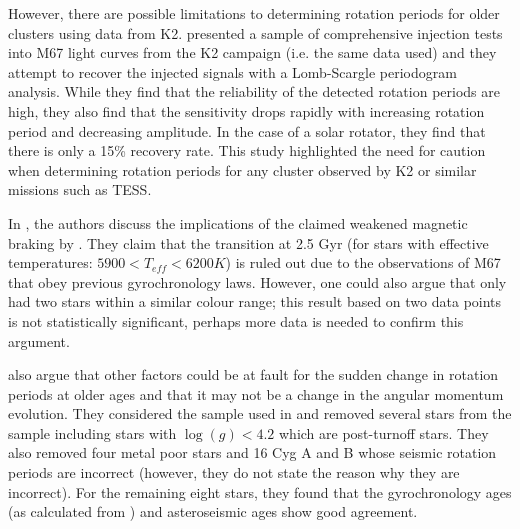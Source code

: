 However, there are possible limitations to determining rotation periods for older clusters using data from K2. \citet{Esselstein_etal_2018} presented a sample of comprehensive injection tests into M67 light curves from the K2 campaign (i.e. the same data \citealt{Barnes_etal_2016} used) and they attempt to recover the injected signals with a Lomb-Scargle periodogram analysis. While they find that the reliability of the detected rotation periods are high, they also find that the sensitivity drops rapidly with increasing rotation period and decreasing amplitude. In the case of a solar rotator, they find that there is only a 15\% recovery rate. This study highlighted the need for caution when determining rotation periods for any cluster observed by K2 or similar missions such as TESS.

In \citet{Barnes_etal_2016_aspect_gyro}, the authors discuss the implications of the claimed weakened magnetic braking by \citet{van_Saders_etal_2016}. They claim that the transition at 2.5 Gyr (for stars with effective temperatures: $5900 < T_{eff} < 6200 K$) is ruled out due to the observations of M67 \citep{Barnes_etal_2016} that obey previous gyrochronology laws. However, one could also argue that \citet{Barnes_etal_2016} only had two stars within a similar colour range; this result based on two data points is not statistically significant, perhaps more data is needed to confirm this argument.

\citet{Barnes_etal_2016_aspect_gyro} also argue that other factors could be at fault for the sudden change in rotation periods at older ages and that it may not be a change in the angular momentum evolution. They considered the sample used in \citet{van_Saders_etal_2016} and removed several stars from the sample including stars with $\log(g) < 4.2$ which are post-turnoff stars. They also removed four metal poor stars and 16 Cyg A and B whose seismic rotation periods are incorrect (however, they do not state the reason why they are incorrect). For the remaining eight stars, they found that the gyrochronology ages (as calculated from \citealt{Barnes_2010}) and asteroseismic ages show good agreement.

